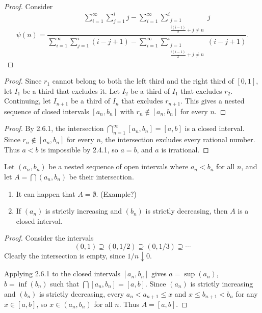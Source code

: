 \begin{proof}
    Consider
\[
    \psi(n)=
    \frac{
    \displaystyle
    \sum_{i=1}^{\infty}\sum_{j=1}^{i} j
    -
    \sum_{i=1}^{\infty}\sum_{\substack{j=1\\ \frac{i(i-1)}{2}+j\neq n}}^{i} j
    }{
    \displaystyle
    \sum_{i=1}^{\infty}\sum_{j=1}^{i} (i-j+1)
    -
    \sum_{i=1}^{\infty}\sum_{\substack{j=1\\ \frac{i(i-1)}{2}+j\neq n}}^{i} (i-j+1)
    }.
\]
\end{proof}

\begin{proof}
    Since $r_1$ cannot belong to both the left third and the right third
    of $[0,1]$, let $I_1$ be a third that excludes it. Let $I_2$ be a
    third of $I_1$ that excludes $r_2$. Continuing, let $I_{n+1}$ be a
    third of $I_n$ that excludes $r_{n+1}$. This gives a nested sequence
    of closed intervals $[a_n, b_n]$ with $r_n \notin [a_n, b_n]$ for
    every $n$.
\end{proof}

\begin{proof}
    By 2.6.1, the intersection $\bigcap_{n=1}^{\infty} [a_n, b_n] = [a,b]$
    is a closed interval. Since $r_n \notin [a_n, b_n]$ for every $n$,
    the intersection excludes every rational number. Thus $a < b$ is
    impossible by 2.4.1, so $a = b$, and $a$ is irrational.
\end{proof}

\begin{tcolorbox}[title=Problem 3, breakable]
    Let $(a_n, b_n)$ be a nested sequence of open intervals where $a_n < b_n$
    for all $n$, and let $A = \bigcap(a_n, b_n)$ be their intersection.
    \begin{enumerate}
        \item It can happen that $A = \emptyset$. (Example?)
        \item If $(a_n)$ is strictly increasing and $(b_n)$ is strictly decreasing,
        then $A$ is a closed interval.
    \end{enumerate}
\end{tcolorbox}

\begin{proof}
    Consider the intervals
    \[(0, 1) \supseteq (0, 1/2) \supseteq (0, 1/3) \supseteq \cdots\]
    Clearly the intersection is empty, since $1/n \downarrow 0$.

    Applying 2.6.1 to the closed intervals $[a_n, b_n]$ gives
    $a = \sup(a_n)$, $b = \inf(b_n)$ such that $\bigcap [a_n, b_n] = [a, b]$.
    Since $(a_n)$ is strictly increasing and $(b_n)$ is strictly decreasing,
    every $a_n < a_{n+1} \leq x$ and $x \leq b_{n+1} < b_n$ for any
    $x \in [a,b]$, so $x \in (a_n, b_n)$ for all $n$. Thus $A = [a, b]$.
\end{proof}

